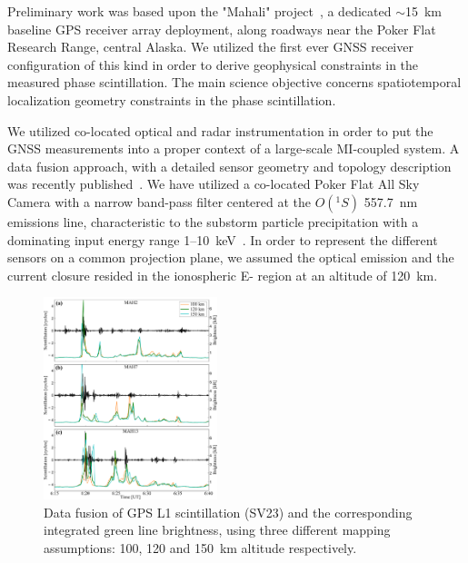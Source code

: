 \documentclass[letterpaper,12pt]{article}
\begin{document}
Preliminary work was based upon the "Mahali" project~\citep{Viktor2014}, a dedicated $\sim$15~km baseline GPS receiver array deployment, along roadways near the Poker Flat Research Range, central Alaska. We utilized the first ever GNSS receiver configuration of this kind in order to derive geophysical constraints in the measured phase scintillation. The main science objective concerns spatiotemporal localization geometry constraints in the phase scintillation. 

We utilized co-located optical and radar instrumentation in order to put the GNSS measurements into a proper context of a large-scale MI-coupled system. A data fusion approach, with a detailed sensor geometry and topology description was recently published~\citep{Mrak2018mahali,Semeter2017}. We have utilized a co-located Poker Flat All Sky Camera with a narrow band-pass filter centered at the $O(^1S)$ 557.7~nm emissions line, characteristic to the substorm particle precipitation with a dominating input energy range 1--10~keV~\citep{Banks1974}. In order to represent the different sensors on a common projection plane, we assumed the optical emission and the current closure resided in the ionospheric E- region at an altitude of 120~km.

\begin{figure}
\vspace{-1em}
\centering
\includegraphics[width=0.45\textwidth]{fig/mapping}
\caption{Data fusion of GPS L1 scintillation (SV23) and the corresponding integrated green line brightness, using three different mapping assumptions: 100, 120 and 150~km altitude respectively. }
\label{fig:mapping}
\end{figure}
\end{document}
